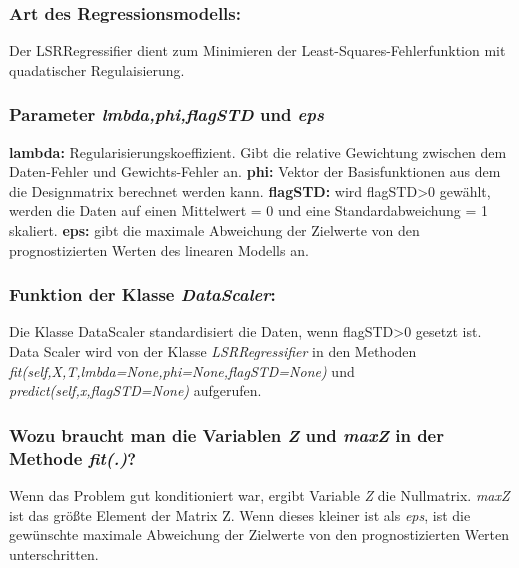 \subsubsection{ Art des Regressionsmodells: }

\noindent
 \vspace{0px}
Der LSRRegressifier dient zum Minimieren der Least-Squares-Fehlerfunktion mit quadatischer Regulaisierung.

\subsubsection{ Parameter \textit{lmbda,phi,flagSTD} und \textit{eps} }

\noindent
\vspace{0px}
\textbf{lambda:} Regularisierungskoeffizient. Gibt die relative Gewichtung zwischen dem Daten-Fehler und Gewichts-Fehler an. 
\noindent
\vspace{0px}
\textbf{phi:} Vektor der Basisfunktionen aus dem die Designmatrix berechnet werden kann. 
\noindent
\vspace{0px}
\textbf{flagSTD:} wird flagSTD>0 gewählt, werden die Daten auf einen Mittelwert = 0 und eine Standardabweichung = 1 skaliert.  
\noindent
\vspace{0px}
\textbf{eps:} gibt die maximale Abweichung der Zielwerte von den prognostizierten Werten des linearen Modells an. 

\subsubsection{ Funktion der Klasse \textit{DataScaler}: }

\noindent
\vspace{0px}
Die Klasse DataScaler standardisiert die Daten, wenn flagSTD>0 gesetzt ist. 
Data Scaler wird von der Klasse \textit{LSRRegressifier} in den Methoden \textit{fit(self,X,T,lmbda=None,phi=None,flagSTD=None)} und \textit{predict(self,x,flagSTD=None)} aufgerufen.


\subsubsection{ Wozu braucht man die Variablen \textit{Z} und \textit{maxZ} in der Methode \textit{fit(.)}? }

\noindent
 \vspace{0px}
Wenn das Problem gut konditioniert war, ergibt Variable \textit{Z} die Nullmatrix. \textit{maxZ} ist das größte Element der Matrix Z.
Wenn dieses kleiner ist als \textit{eps}, ist die gewünschte maximale Abweichung der Zielwerte von den prognostizierten Werten unterschritten. 

